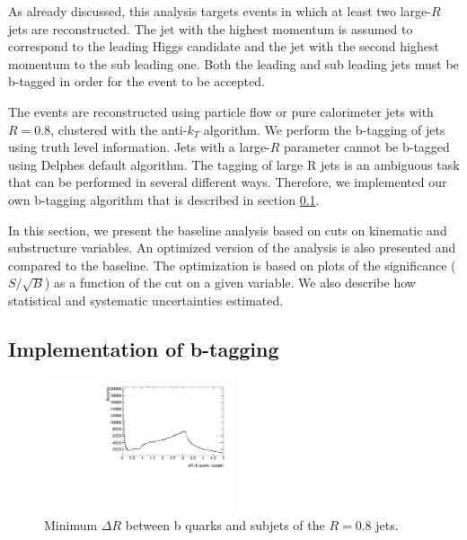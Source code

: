 As already discussed, this analysis targets events in which at least two large-$R$ jets are reconstructed. The jet with the highest momentum is assumed to correspond to the leading Higgs candidate and the jet with the second highest momentum to the sub leading one. Both the leading and sub leading jets must be b-tagged in order for the event to be accepted.

The events are reconstructed using particle flow or pure calorimeter jets with $R=0.8$, clustered with the anti-$k_T$ algorithm. We perform the b-tagging of jets using truth level information. Jets with a large-$R$ parameter cannot be b-tagged using Delphes default algorithm. The tagging of large R jets is an ambiguous task that can be performed in several different ways. Therefore, we implemented our own b-tagging algorithm that is described in section \ref{sec:btagging}. 

In this section, we present the baseline analysis based on cuts on kinematic and substructure variables. An optimized version of the analysis is also presented and compared to the baseline. The optimization is based on plots of the significance ($S/\sqrt{B}$) as a function of the cut on a given variable. We also describe how statistical and systematic uncertainties estimated. 

\subsection{Implementation of b-tagging}
\label{sec:btagging}

\begin{figure}
	\centering
	\includegraphics[width=0.5\textwidth]{./Figures/deltaR_bsubjet}
	\caption{Minimum $\Delta R$ between b quarks and subjets of the $R=0.8$ jets.} 
	\label{fig:deltaR_bsubjet}
\end{figure}

